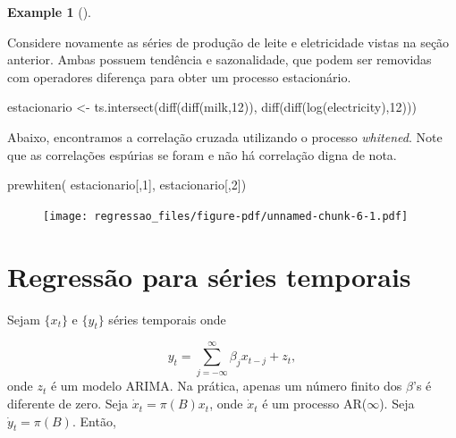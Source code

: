 \documentclass[
  letterpaper,
  DIV=11,
  numbers=noendperiod]{scrartcl}
\newenvironment{Shaded}{\begin{snugshade}}{\end{snugshade}}
\newcommand{\DecValTok}[1]{\textcolor[rgb]{0.68,0.00,0.00}{#1}}
\newcommand{\FunctionTok}[1]{\textcolor[rgb]{0.28,0.35,0.67}{#1}}
\newcommand{\NormalTok}[1]{\textcolor[rgb]{0.00,0.23,0.31}{#1}}
\newcommand{\OtherTok}[1]{\textcolor[rgb]{0.00,0.23,0.31}{#1}}
\theoremstyle{plain}
\theoremstyle{plain}
\theoremstyle{definition}
\newtheorem{example}{Example}[chapter]
\theoremstyle{definition}
\theoremstyle{remark}
\begin{document}
\begin{example}[]\protect\hypertarget{exm-}{}\label{exm-}

Considere novamente as séries de produção de leite e eletricidade vistas
na seção anterior. Ambas possuem tendência e sazonalidade, que podem ser
removidas com operadores diferença para obter um processo estacionário.

\begin{Shaded}
\begin{Highlighting}[]
\NormalTok{estacionario }\OtherTok{\textless{}{-}} \FunctionTok{ts.intersect}\NormalTok{(}\FunctionTok{diff}\NormalTok{(}\FunctionTok{diff}\NormalTok{(milk,}\DecValTok{12}\NormalTok{)),}
\FunctionTok{diff}\NormalTok{(}\FunctionTok{diff}\NormalTok{(}\FunctionTok{log}\NormalTok{(electricity),}\DecValTok{12}\NormalTok{)))}
\end{Highlighting}
\end{Shaded}

Abaixo, encontramos a correlação cruzada utilizando o processo
\emph{whitened}. Note que as correlações espúrias se foram e não há
correlação digna de nota.

\begin{Shaded}
\begin{Highlighting}[]
\FunctionTok{prewhiten}\NormalTok{( estacionario[,}\DecValTok{1}\NormalTok{],  estacionario[,}\DecValTok{2}\NormalTok{])}
\end{Highlighting}
\end{Shaded}

\begin{figure}[H]

{\centering \texttt{[image: regressao\_files/figure-pdf/unnamed-chunk-6-1.pdf]}

}

\end{figure}

\end{example}

\hypertarget{regressuxe3o-para-suxe9ries-temporais}{%
\section{Regressão para séries
temporais}\label{regressuxe3o-para-suxe9ries-temporais}}

Sejam \(\{x_t\}\) e \(\{y_t\}\) séries temporais onde

\[y_t=\sum_{j=-\infty}^\infty \beta_j x_{t-j}+z_t,\] onde \(z_t\) é um
modelo ARIMA. Na prática, apenas um número finito dos \(\beta\)'s é
diferente de zero. Seja \(\dot{x}_t=\pi(B)x_t\), onde \(\dot{x}_t\) é um
processo AR(\(\infty\)). Seja \(\dot{y}_t=\pi(B)\). Então,
\end{document}
